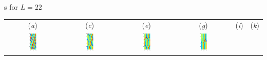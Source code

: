 \documentclass{theo1poster}[2003/04/25]
\begin{document}
\begin{poster}{3}
\begin{sheet}{\Rpo s for $L=22$}
\begin{center}
\begin{tabular}{cccccc} (\textit{a}) & (\textit{c}) & (\textit{e}) &
                        (\textit{g}) & (\textit{i}) & (\textit{k})\\
\includegraphics[width=0.15\textwidth]{../../figs/ks22rpo016.3-02.86.eps}\hspace{-3ex} &
\includegraphics[width=0.15\textwidth]{../../figs/ks22rpo033.5-04.04.eps}\hspace{-3ex} &
\includegraphics[width=0.15\textwidth]{../../figs/ks22rpo047.6-05.68.eps}\hspace{-3ex} &
\includegraphics[width=0.15\textwidth]{../../figs/ks22rpo071.7-05.50.eps}\hspace{-3ex} &

\end{tabular}
\end{center}
\end{sheet}
\end{poster}
\end{document}
